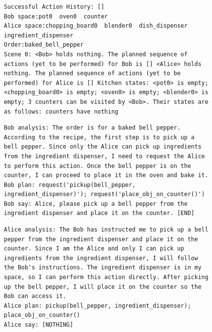 \documentclass[11pt]{article}
\begin{document}
\begin{figure}[H]
\begin{lstlisting}[caption={Case 1 Agent Bob's input},label={lst-1-1}]
Successful Action History: []
Bob space:pot0  oven0  counter 
Alice space:chopping_board0  blender0  dish_dispenser  ingredient_dispenser
Order:baked_bell_pepper
Scene 0: <Bob> holds nothing. The planned sequence of actions (yet to be performed) for Bob is [] <Alice> holds nothing. The planned sequence of actions (yet to be performed) for Alice is [] Kitchen states: <pot0> is empty; <chopping_board0> is empty; <oven0> is empty; <blender0> is empty; 3 counters can be visited by <Bob>. Their states are as follows: counters have nothing
\end{lstlisting}
\end{figure}

\begin{figure}[H]

\begin{lstlisting}[caption={Case 1 Agent Bob's output},label={lst-1-2}]
Bob analysis: The order is for a baked bell pepper. According to the recipe, the first step is to pick up a bell pepper. Since only the Alice can pick up ingredients from the ingredient dispenser, I need to request the Alice to perform this action. Once the bell pepper is on the counter, I can proceed to place it in the oven and bake it.
Bob plan: request('pickup(bell_pepper, ingredient_dispenser)'); request('place_obj_on_counter()')
Bob say: Alice, please pick up a bell pepper from the ingredient dispenser and place it on the counter. [END]
\end{lstlisting}
\end{figure}

\begin{figure}[H]

\begin{lstlisting}[caption={Case 1 Agent Alice's output},label={lst-1-3}]
Alice analysis: The Bob has instructed me to pick up a bell pepper from the ingredient dispenser and place it on the counter. Since I am the Alice and only I can pick up ingredients from the ingredient dispenser, I will follow the Bob's instructions. The ingredient dispenser is in my space, so I can perform this action directly. After picking up the bell pepper, I will place it on the counter so the Bob can access it.
Alice plan: pickup(bell_pepper, ingredient_dispenser); place_obj_on_counter()
Alice say: [NOTHING]
\end{lstlisting}
\end{figure}
\end{document}
